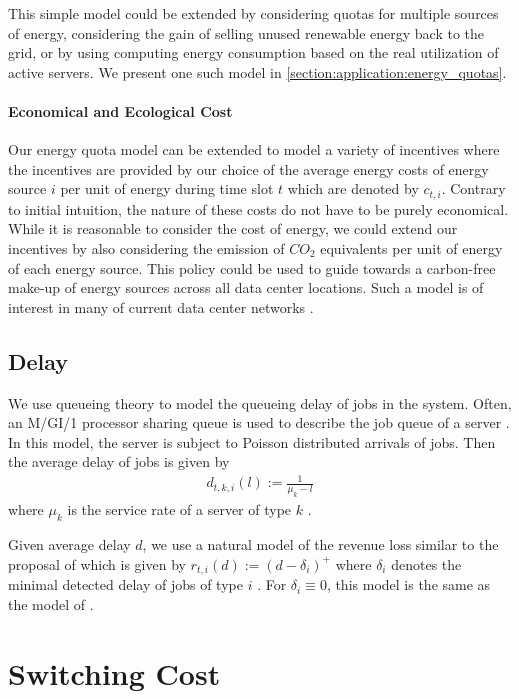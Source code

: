 This simple model could be extended by considering quotas for multiple sources of energy, considering the gain of selling unused renewable energy back to the grid, or by using computing energy consumption based on the real utilization of active servers. We present one such model in \autoref{section:application:energy_quotas}.

\paragraph{Economical and Ecological Cost} Our energy quota model can be extended to model a variety of incentives where the incentives are provided by our choice of the average energy costs of energy source $i$ per unit of energy during time slot $t$ which are denoted by $c_{t,i}$. Contrary to initial intuition, the nature of these costs do not have to be purely economical. While it is reasonable to consider the cost of energy, we could extend our incentives by also considering the emission of $CO_2$ equivalents per unit of energy of each energy source. This policy could be used to guide towards a carbon-free make-up of energy sources across all data center locations. Such a model is of interest in many of current data center networks \cite{Hölzle2020, Miller2021}.

\subsection{Delay}

We use queueing theory to model the queueing delay of jobs in the system. Often, an M/GI/1 processor sharing queue is used to describe the job queue of a server \cite{Lin2011, Lin2012}. In this model, the server is subject to Poisson distributed arrivals of jobs. Then the average delay of jobs is given by \begin{align*}
    d_{t,k,i}(l) := \frac{1}{\mu_k - l}
\end{align*} where $\mu_k$ is the service rate of a server of type $k$ \cite{Lin2012}.

Given average delay $d$, we use a natural model of the revenue loss similar to the proposal of \citeauthor*{Lin2011} which is given by $r_{t,i}(d) := (d - \delta_i)^+$ where $\delta_i$ denotes the minimal detected delay of jobs of type $i$ \cite{Lin2011}. For $\delta_i \equiv 0$, this model is the same as the model of \cite{Lin2012}.

\section{Switching Cost}

